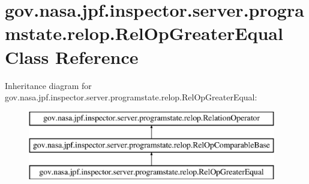 \hypertarget{classgov_1_1nasa_1_1jpf_1_1inspector_1_1server_1_1programstate_1_1relop_1_1_rel_op_greater_equal}{}\section{gov.\+nasa.\+jpf.\+inspector.\+server.\+programstate.\+relop.\+Rel\+Op\+Greater\+Equal Class Reference}
\label{classgov_1_1nasa_1_1jpf_1_1inspector_1_1server_1_1programstate_1_1relop_1_1_rel_op_greater_equal}
Inheritance diagram for gov.\+nasa.\+jpf.\+inspector.\+server.\+programstate.\+relop.\+Rel\+Op\+Greater\+Equal\+:\begin{figure}[H]
\begin{center}
\leavevmode
\includegraphics[height=3.000000cm]{classgov_1_1nasa_1_1jpf_1_1inspector_1_1server_1_1programstate_1_1relop_1_1_rel_op_greater_equal}
\end{center}
\end{figure}
